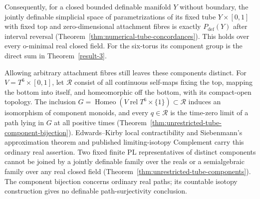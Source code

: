 \documentclass[11pt,a4paper]{article}
\theoremstyle{definition}
\begin{document}
Consequently, for a closed bounded definable manifold $Y$ without
boundary, the jointly definable simplicial space of parametrizations
of its fixed tube $Y\times[0,1]$ with fixed top and zero-dimensional
attachment fibres is exactly $P_{\mathrm{def}}(Y)$ after interval
reversal (Theorem~\ref{thm:numerical-tube-concordances}). This holds
over every o-minimal real closed field. For the six-torus its
component group is the direct sum in Theorem~\ref{result-3}.

Allowing arbitrary attachment fibres still leaves these components
distinct. For $V=T^6\times[0,1]$, let $\mathcal R$ consist of all
continuous self-maps fixing the top, mapping the bottom into itself,
and homeomorphic off the bottom, with its compact-open topology.
The inclusion $G=\operatorname{Homeo}(V\;\mathrm{rel}\;
T^6\times\{1\})\subset\mathcal R$ induces an isomorphism of
component monoids, and every $q\in\mathcal R$ is the time-zero
limit of a path lying in $G$ at all positive times
(Theorem~\ref{thm:unrestricted-tube-component-bijection}).
Edwards--Kirby local contractibility and Siebenmann's approximation
theorem and published limiting-isotopy Complement carry this
ordinary real assertion. Two fixed finite PL representatives of
distinct components cannot be joined by a jointly definable family
over the reals or a semialgebraic family over any real closed field
(Theorem~\ref{thm:unrestricted-tube-components}). The component
bijection concerns ordinary real paths; its countable isotopy
construction gives no definable path-surjectivity conclusion.
\end{document}
